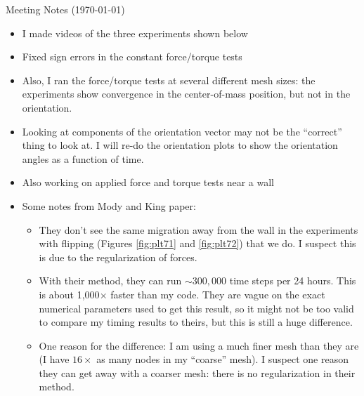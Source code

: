\documentclass{article}
\begin{document}
\pagestyle{plain}

\begin{center}
  {\Large Meeting Notes (\today)}
\end{center}

\begin{itemize}
\item I made videos of the three experiments shown below
\item Fixed sign errors in the constant force/torque tests
\item Also, I ran the force/torque tests at several different mesh
  sizes: the experiments show convergence in the center-of-mass
  position, but not in the orientation. 
\item Looking at components of the orientation vector may not be the
  ``correct'' thing to look at. I will re-do the orientation plots to
  show the orientation angles as a function of time.
\item Also working on applied force and torque tests near a wall
\item Some notes from Mody and King paper:
  \begin{itemize}
  \item They don't see the same migration away from the wall in the
    experiments with flipping (Figures \ref{fig:plt71} and
    \ref{fig:plt72}) that we do. I suspect this is due to the
    regularization of forces.
  \item With their method, they can run $\sim300,000$ time steps per
    24 hours. This is about 1,000$\times$ faster than my code. They
    are vague on the exact numerical parameters used to get this
    result, so it might not be too valid to compare my timing results
    to theirs, but this is still a huge difference.
  \item One reason for the difference: I am using a much finer mesh
    than they are (I have $16\times$ as many nodes in my ``coarse''
    mesh). I suspect one reason they can get away with a coarser mesh:
    there is no regularization in their method.
  \end{itemize}
\end{itemize}
\end{document}
